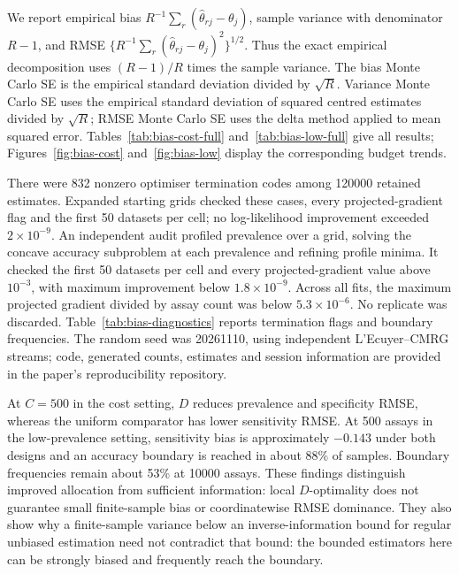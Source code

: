 \documentclass[11pt]{article}
\begin{document}
We report empirical bias $R^{-1}\sum_r(\hat\theta_{rj}-\theta_j)$, sample variance with denominator $R-1$, and RMSE $\{R^{-1}\sum_r(\hat\theta_{rj}-\theta_j)^2\}^{1/2}$. Thus the exact empirical decomposition uses $(R-1)/R$ times the sample variance. The bias Monte Carlo SE is the empirical standard deviation divided by $\sqrt R$. Variance Monte Carlo SE uses the empirical standard deviation of squared centred estimates divided by $\sqrt R$; RMSE Monte Carlo SE uses the delta method applied to mean squared error. Tables~\ref{tab:bias-cost-full} and~\ref{tab:bias-low-full} give all results; Figures~\ref{fig:bias-cost} and~\ref{fig:bias-low} display the corresponding budget trends.

There were 832 nonzero optimiser termination codes among 120000 retained estimates. Expanded starting grids checked these cases, every projected-gradient flag and the first 50 datasets per cell; no log-likelihood improvement exceeded $2\times10^{-9}$. An independent audit profiled prevalence over a grid, solving the concave accuracy subproblem at each prevalence and refining profile minima. It checked the first 50 datasets per cell and every projected-gradient value above $10^{-3}$, with maximum improvement below $1.8\times10^{-9}$. Across all fits, the maximum projected gradient divided by assay count was below $5.3\times10^{-6}$. No replicate was discarded. Table~\ref{tab:bias-diagnostics} reports termination flags and boundary frequencies. The random seed was 20261110, using independent L'Ecuyer--CMRG streams; code, generated counts, estimates and session information are provided in the paper's reproducibility repository.

At $C=500$ in the cost setting, $D$ reduces prevalence and specificity RMSE, whereas the uniform comparator has lower sensitivity RMSE. At 500 assays in the low-prevalence setting, sensitivity bias is approximately $-0.143$ under both designs and an accuracy boundary is reached in about 88\% of samples. Boundary frequencies remain about 53\% at 10000 assays. These findings distinguish improved allocation from sufficient information: local $D$-optimality does not guarantee small finite-sample bias or coordinatewise RMSE dominance. They also show why a finite-sample variance below an inverse-information bound for regular unbiased estimation need not contradict that bound: the bounded estimators here can be strongly biased and frequently reach the boundary.
\end{document}
